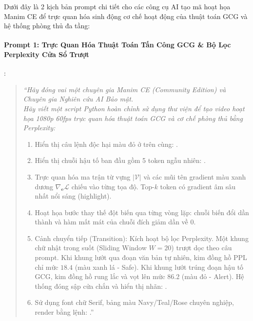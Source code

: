 \begin{simulationbox}
Dưới đây là 2 kịch bản prompt chi tiết cho các công cụ AI tạo mã hoạt họa Manim CE để trực quan hóa sinh động cơ chế hoạt động của thuật toán GCG và hệ thống phòng thủ đa tầng:

\paragraph{Prompt 1: Trực Quan Hóa Thuật Toán Tấn Công GCG \& Bộ Lọc Perplexity Cửa Sổ Trượt}:
\begin{quote}
\small\itshape
``Hãy đóng vai một chuyên gia Manim CE (Community Edition) và Chuyên gia Nghiên cứu AI Bảo mật. \\
Hãy viết một script Python hoàn chỉnh sử dụng thư viện  để tạo video hoạt họa 1080p 60fps trực quan hóa thuật toán GCG và cơ chế phòng thủ bằng Perplexity:
\begin{enumerate}
  \item Hiển thị câu lệnh độc hại màu đỏ ở trên cùng: .
  \item Hiển thị chuỗi hậu tố ban đầu gồm 5 token ngẫu nhiên: \code{[p1, p2, p3, p4, p5]}.
  \item Trực quan hóa ma trận từ vựng $|\mathcal{V}|$ và các mũi tên gradient màu xanh dương $\nabla_{\mathbf{e}} \mathcal{L}$ chiếu vào từng tọa độ. Top-$k$ token có gradient âm sâu nhất nổi sáng (highlight).
  \item Hoạt họa bước thay thế đột biến qua từng vòng lặp: chuỗi biến đổi dần thành  và hàm mất mát của chuỗi đích  giảm dần về 0.
  \item Cảnh chuyển tiếp (Transition): Kích hoạt bộ lọc Perplexity. Một khung chữ nhật trong suốt (Sliding Window $W=20$) trượt dọc theo câu prompt. Khi khung lướt qua đoạn văn bản tự nhiên, kim đồng hồ PPL chỉ mức $18.4$ (màu xanh lá - Safe). Khi khung lướt trúng đoạn hậu tố GCG, kim đồng hồ rung lắc và vọt lên mức $86.2$ (màu đỏ - Alert). Hệ thống đóng sập cửa chắn và hiển thị nhãn: .
  \item Sử dụng font chữ Serif, bảng màu Navy/Teal/Rose chuyên nghiệp, render bằng lệnh: .''
\end{enumerate}
\end{quote}


\end{simulationbox}
